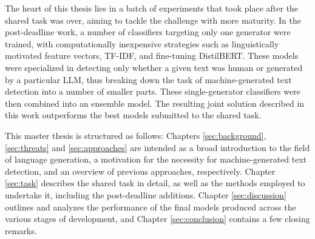 The heart of this thesis lies in a batch of experiments that took place after the shared task was over, aiming to tackle the challenge with more maturity.
In the post-deadline work, a number of classifiers targeting only one generator were trained, with computationally inexpensive strategies such as linguistically motivated feature vectors, TF-IDF, and fine-tuning DistilBERT.
These models were specialized in detecting only whether a given text was human or generated by a particular LLM, thus breaking down the task of machine-generated text detection into a number of smaller parts.
These single-generator classifiers were then combined into an ensemble model.
The resulting joint solution described in this work outperforms the best models submitted to the shared task.

This master thesis is structured as follows: Chapters \ref{sec:background}, \ref{sec:threats} and \ref{sec:approaches} are intended as a broad introduction to the field of language generation, a motivation for the necessity for machine-generated text detection, and an overview of previous approaches, respectively.
Chapter \ref{sec:task} describes the shared task in detail, as well as the methods employed to undertake it, including the post-deadline additions.
Chapter \ref{sec:discussion} outlines and analyzes the performance of the final models produced across the various stages of development, and Chapter \ref{sec:conclusion} contains a few closing remarks.